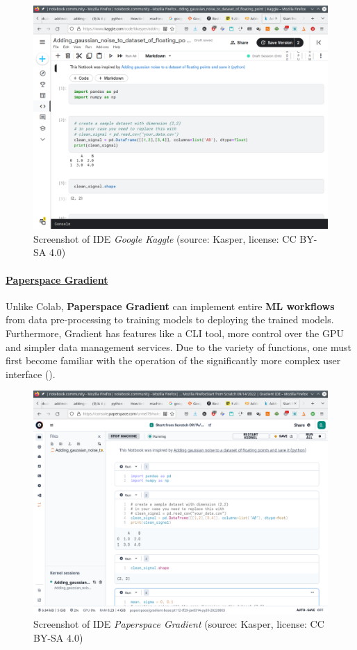 \documentclass [oneside,10pt,a4paper,ngerman,BCOR10mm,headsepline,parindent,final]{scrartcl}
\begin{document}
\begin{figure}
\centering
\includegraphics{images/Screenshot_google_Kaggle.png}
\caption{Screenshot of IDE \emph{Google Kaggle} (source: Kasper,
license: CC BY-SA 4.0)}
\end{figure}

    \hypertarget{paperspace-gradient}{%
\paragraph{\texorpdfstring{\href{https://www.paperspace.com/gradient/notebooks}{Paperspace
Gradient}}{Paperspace Gradient}}\label{paperspace-gradient}}

Unlike Colab, \textbf{Paperspace Gradient} can implement entire
\textbf{ML workflows} from data pre-processing to training models to
deploying the trained models. Furthermore, Gradient has features like a
CLI tool, more control over the GPU and simpler data management
services. Due to the variety of functions, one must first become
familiar with the operation of the significantly more complex user
interface (\cite{Free_GPUs_for_ML_2020}).

\begin{figure}
\centering
\includegraphics{images/Screenshot_Paperspace_Gradient.png}
\caption{Screenshot of IDE \emph{Paperspace Gradient} (source: Kasper,
license: CC BY-SA 4.0)}
\end{figure}
\end{document}
